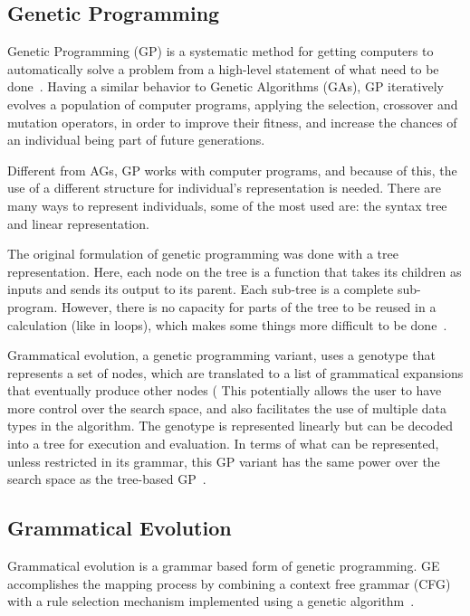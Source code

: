 \documentclass[conference,compsoc]{IEEEtran}
\begin{document}
\subsection{Genetic Programming}

Genetic Programming (GP) is a systematic method for getting computers to automatically solve a problem from a high-level statement of what need to be done~\cite{koza2005genetic}. Having a similar behavior to Genetic Algorithms (GAs), GP iteratively evolves a population of computer programs, applying the selection, crossover and mutation operators, in order to improve their fitness, and increase the chances of an individual being part of future generations.

Different from AGs, GP works with computer programs, and because of this, the use of a different structure for individual's representation is needed. There are many ways to represent individuals, some of the most used are: the syntax tree and linear representation.

The original formulation of genetic programming was done with a tree representation. Here, each node on the tree is a function that takes its children as inputs and sends its output to its parent. Each sub-tree is a complete sub-program. However, there is no capacity for parts of the tree to be reused in a calculation (like in loops), which makes some things more difficult to be done~\cite{harris2015comparison}. 


Grammatical evolution, a genetic programming variant, uses a genotype that represents a set of nodes, which are translated to a list of grammatical expansions that eventually produce other nodes (%
This potentially allows the user to have more control over the search space, and also facilitates the use of multiple data types in the algorithm. The genotype is represented linearly but can be decoded into a tree for execution and evaluation. In terms of what can be represented, unless restricted in its grammar, this GP variant has the same power over the search space as the tree-based GP~\cite{harris2015comparison}.


\subsection{Grammatical Evolution} \label{subsection:grammaticalEvolution}

Grammatical evolution is a grammar based form of genetic programming. GE accomplishes the mapping process by combining a context free grammar (CFG) with a rule selection mechanism implemented using a genetic algorithm~\cite{byrne2015optimising}.
\end{document}
